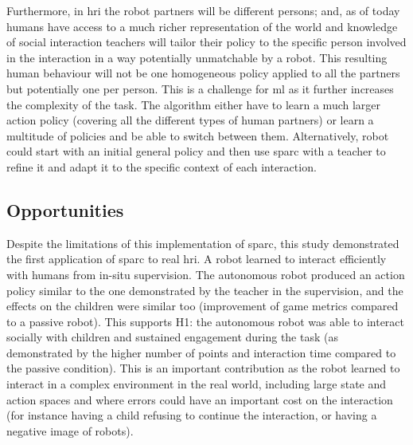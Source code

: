 Furthermore, in \gls{hri} the robot partners will be different persons; and, as of today humans have access to a much richer representation of the world and knowledge of social interaction teachers will tailor their policy to the specific person involved in the interaction in a way potentially unmatchable by a robot. This resulting human behaviour will not be one homogeneous policy applied to all the partners but potentially one per person. This is a challenge for \gls{ml} as it further increases the complexity of the task. The algorithm either have to learn a much larger action policy (covering all the different types of human partners) or learn a multitude of policies and be able to switch between them. Alternatively, robot could start with an initial general policy and then use \gls{sparc} with a teacher to refine it and adapt it to the specific context of each interaction.

\subsection{Opportunities} \label{sec:tutoring_opportunities}

Despite the limitations of this implementation of \gls{sparc}, this study demonstrated the first application of \gls{sparc} to real \gls{hri}. A robot learned to interact efficiently with humans from in-situ supervision.  The autonomous robot produced an action policy similar to the one demonstrated by the teacher in the supervision, and the effects on the children were similar too (improvement of game metrics compared to a passive robot). This supports H1: the autonomous robot was able to interact socially with children and sustained engagement during the task (as demonstrated by the higher number of points and interaction time compared to the passive condition). This is an important contribution as the robot learned to interact in a complex environment in the real world, including large state and action spaces and where errors could have an important cost on the interaction (for instance having a child refusing to continue the interaction, or having a negative image of robots).

